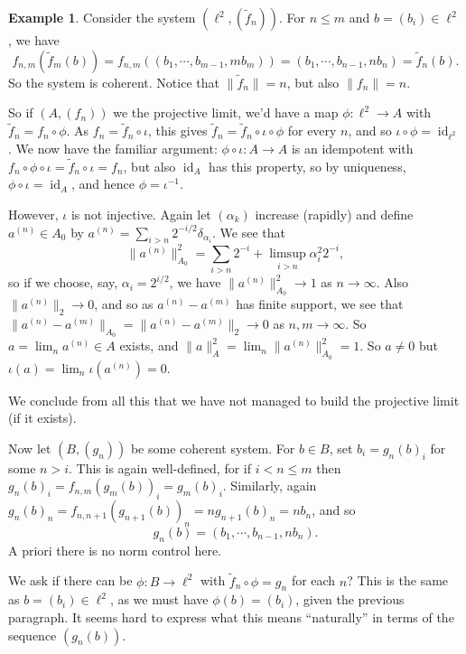 \documentclass[a4paper,11pt]{article}
\newcommand{\id}{\operatorname{id}}
\theoremstyle{definition}
\newtheorem{example}[lemma]{Example}
\begin{document}
\begin{example}
\medskip

Consider the system $(\ell^2, (\tilde f_n))$. For $n\leq m$ and $b=(b_i)\in\ell^2$, we have
\[ f_{n,m}(\tilde f_m(b))
= f_{n,m}((b_1,\cdots,b_{m-1},mb_m))
= (b_1,\cdots,b_{n-1},nb_n)
= \tilde f_n(b). \]
So the system is coherent.  Notice that $\|\tilde f_n\| = n$, but also $\|f_n\|=n$.

So if $(A,(f_n))$ we the projective limit, we'd have a map $\phi \colon \ell^2 \to A$ with $\tilde f_n = f_n \circ \phi$.  As $f_n = \tilde f_n \circ \iota$, this gives $\tilde f_n = \tilde f_n \circ \iota \circ \phi$ for every $n$, and so $\iota\circ\phi = \id_{\ell^2}$.  We now have the familiar argument: $\phi\circ\iota \colon A\to A$ is an idempotent with $f_n \circ \phi\circ\iota = \tilde f_n \circ \iota = f_n$, but also $\id_A$ has this property, so by uniqueness, $\phi\circ\iota = \id_A$, and hence $\phi = \iota^{-1}$.

\medskip

However, $\iota$ is not injective.  Again let $(\alpha_k)$ increase (rapidly) and define $a^{(n)} \in A_0$ by $a^{(n)} = \sum_{i > n} 2^{-i/2} \delta_{\alpha_i}$.  We see that
\[ \|a^{(n)}\|_{A_0}^2 = \sum_{i>n} 2^{-i} + \limsup_{i>n} \alpha_i^2 2^{-i}, \]
so if we choose, say, $\alpha_i = 2^{i/2}$, we have $\|a^{(n)}\|_{A_0}^2 \to 1$ as $n\to\infty$.
Also $\|a^{(n)}\|_2 \to 0$, and so as $a^{(n)}-a^{(m)}$ has finite support, we see that $\|a^{(n)} - a^{(m)}\|_{A_0} = \|a^{(n)}-a^{(m)}\|_2 \to 0$ as $n,m\to\infty$.  So $a = \lim_n a^{(n)} \in A$ exists, and $\|a\|_A^2 = \lim_n \|a^{(n)}\|_{A_0}^2 = 1$.  So $a\not=0$ but $\iota(a) = \lim_n \iota(a^{(n)}) = 0$.

We conclude from all this that we have not managed to build the projective limit (if it exists).

\medskip

Now let $(B,(g_n))$ be some coherent system.  For $b\in B$, set $b_i = g_n(b)_i$ for some $n>i$.  This is again well-defined, for if $i<n\leq m$ then $g_n(b)_i = f_{n,m}(g_m(b))_i = g_m(b)_i$.  Similarly, again $g_n(b)_n = f_{n,n+1}(g_{n+1}(b))_n = n g_{n+1}(b)_n = nb_n$, and so
\[ g_n(b) = (b_1,\cdots,b_{n-1},nb_n). \]
A priori there is no norm control here.

We ask if there can be $\phi \colon B \to \ell^2$ with $\tilde f_n \circ \phi = g_n$ for each $n$?  This is the same as $b=(b_i)\in\ell^2$, as we must have $\phi(b) = (b_i)$, given the previous paragraph.  It seems hard to express what this means ``naturally'' in terms of the sequence $(g_n(b))$.
\end{example}
\end{document}

